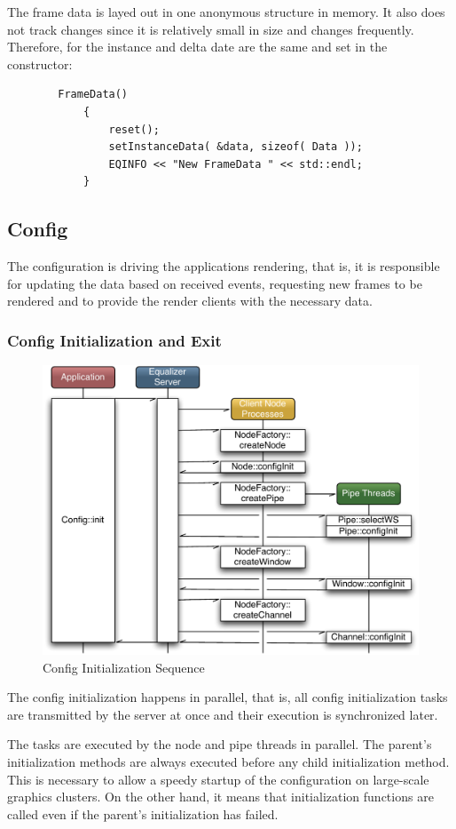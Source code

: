 \documentclass[10pt,a4]{scrartcl}
\begin{document}
The frame data is layed out in one anonymous structure in
memory. It also does not track changes since it is relatively small in
size and changes frequently. Therefore, for the instance and delta
date are the same and set in the constructor:

{\footnotesize\begin{lstlisting}
        FrameData()
            {
                reset();
                setInstanceData( &data, sizeof( Data ));
                EQINFO << "New FrameData " << std::endl;
            }
\end{lstlisting}}%

\subsection{Config}

The configuration is driving the applications rendering, that is, it is
responsible for updating the data based on received events, requesting
new frames to be rendered and to provide the render clients with the
necessary data.

\subsubsection{Config Initialization and Exit}

\begin{figure}
  \includegraphics[width=.6\textwidth]{images/configInit.pdf}
  {\caption{\small\label{fConfigInit}Config Initialization Sequence}}
\end{figure}
The config initialization happens in parallel, that is, all config
initialization tasks are transmitted by the server at once and their
execution is synchronized later. 

The tasks are executed by the node and pipe threads in parallel. The
parent's initialization methods are always executed before any child
initialization method. This is necessary to allow a speedy startup of
the configuration on large-scale graphics clusters. On the other hand,
it means that initialization functions are called even if the parent's
initialization has failed.
\end{document}
